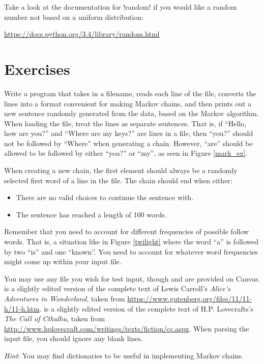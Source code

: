 \documentclass[11pt]{cselabheader}
\begin{document}
Take a look at the documentation for \pythoninline!random! if you would like a
random number not based on a uniform distribution:
\begin{center}
  \url{https://docs.python.org/3.4/library/random.html}
\end{center}

\clearpage
\section{Exercises}
\label{sec:ex}

\begin{ex}[markov.py]
  Write a program that takes in a filename, reads each line of the file,
  converts the lines into a format convenient for making Markov chains, and
  then prints out a new sentence randomly generated from the data, based on
  the Markov algorithm. When loading the file, treat the lines as separate
  sentences. That is, if ``Hello, how are you?'' and ``Where are my keys?''
  are lines in a file, then ``you?'' should not be followed by ``Where'' when
  generating a chain. However, ``are'' should be allowed to be followed by
  either ``you?'' or ``my'', as seen in Figure \ref{mark_ex}.

  When creating a new chain, the first element should always be a randomly
  selected first word of a line in the file. The chain should end when either:
  \begin{itemize}
  \item There are no valid choices to continue the sentence with.
  \item The sentence has reached a length of 100 words.
  \end{itemize}

  Remember that you need to account for different frequencies of possible
  follow words. That is, a situation like in Figure \ref{twilight} where
  the word ``a'' is followed by two ``is'' and one ``known''. You need to
  account for whatever word frequencies might come up within your input file.

  You may use any file you wish for test input, though 
  and  are provided on Canvas.
   is a slightly edited version of the complete text of
  Lewis Carroll's \emph{Alice's Adventures in Wonderland}, taken from
  \url{https://www.gutenberg.org/files/11/11-h/11-h.htm}.
   is a slightly edited version of the complete text of
  H.P. Lovecrafts's \emph{The Call of Cthulhu}, taken from
  \url{http://www.hplovecraft.com/writings/texts/fiction/cc.aspx}.
  When parsing the input file, you should ignore any blank lines.

  \emph{Hint}: You may find dictionaries to be useful in implementing
  Markov chains.
\end{ex}
\end{document}
